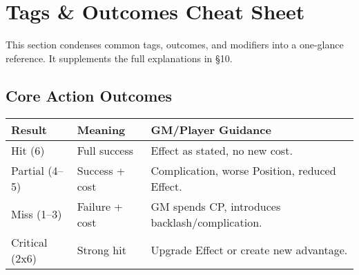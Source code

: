 

\section{Tags \& Outcomes Cheat Sheet}
\label{sec:tags-cheatsheet}

This section condenses common tags, outcomes, and modifiers into a one-glance reference. It supplements the full explanations in \S10.

\setlength{\extrarowheight}{2pt}

\subsection{Core Action Outcomes}
\begin{center}
\begin{tabular}{|p{2.4cm}|p{3.0cm}|p{8.0cm}|}
\hline
\textbf{Result} & \textbf{Meaning} & \textbf{GM/Player Guidance} \\ \hline
Hit (6) & Full success & Effect as stated, no new cost. \\ \hline
Partial (4--5) & Success + cost & Complication, worse Position, reduced Effect. \\ \hline
Miss (1--3) & Failure + cost & GM spends CP, introduces backlash/complication. \\ \hline
Critical (2x6) & Strong hit & Upgrade Effect or create new advantage. \\ \hline
\end{tabular}
\end{center}

